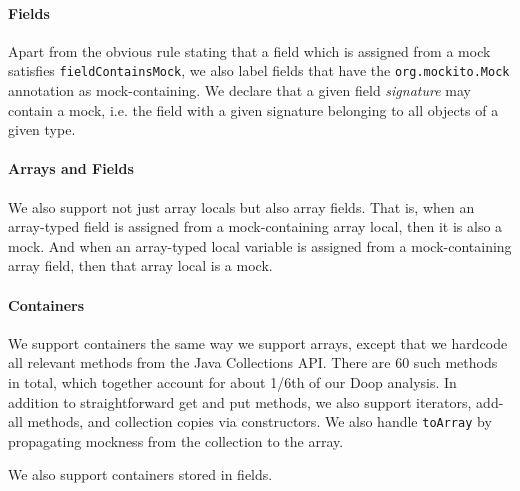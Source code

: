 \paragraph{Fields} Apart from the obvious rule stating that a field which is assigned from a mock satisfies {\tt fieldContainsMock}, we also label fields that have the {\tt org.mockito.Mock} annotation as mock-containing. We declare that a given field \emph{signature} may contain a mock, i.e. the field with a given signature belonging to all objects of a given type.

\paragraph{Arrays and Fields} We also support not just array locals but also array fields. That is, when an array-typed field is assigned from a mock-containing array local, then it is also a mock. And when an array-typed local variable is assigned from a mock-containing array field, then that array local is a mock.

\paragraph{Containers} We support containers the same way we support arrays, except that we hardcode all relevant methods from the Java Collections API. There are 60 such methods in total, which together account for about 1/6th of our Doop analysis. In addition to straightforward get and put methods, we also support iterators, add-all methods, and collection copies via constructors. We also handle {\tt toArray} by propagating mockness from the collection to the array.

We also support containers stored in fields.

